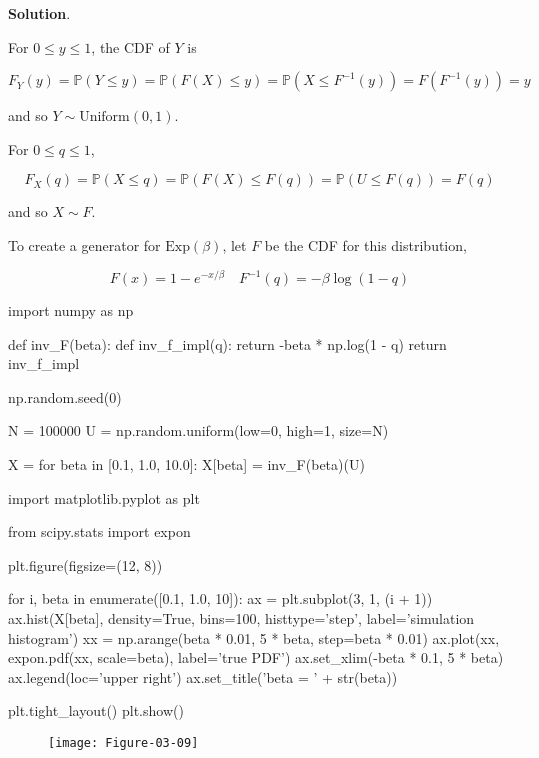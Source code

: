 \textbf{Solution}.

For \(0 \leq y \leq 1\), the CDF of \(Y\) is

\[ F_Y(y) = \mathbb{P}(Y \leq y) = \mathbb{P}(F(X) \leq y) = \mathbb{P}(X \leq F^{-1}(y)) = F(F^{-1}(y)) = y\]

and so \(Y \sim \text{Uniform}(0, 1)\).

For \(0 \leq q \leq 1\),

\[ F_X(q) = \mathbb{P}(X \leq q) = \mathbb{P}(F(X) \leq F(q)) = \mathbb{P}(U \leq F(q)) = F(q) \]

and so \(X \sim F\).

To create a generator for \(\text{Exp}(\beta)\), let \(F\) be the CDF
for this distribution,

\[ F(x) = 1 - e^{-x/\beta} \quad F^{-1}(q) = - \beta \log (1 - q) \]

\begin{python}
import numpy as np

def inv_F(beta):
    def inv_f_{i}mpl(q):
        return -beta * np.log(1 - q)
    return inv_f_{i}mpl
\end{python}

\begin{python}
np.random.seed(0)

N = 100000
U = np.random.uniform(low=0, high=1, size=N)

X = {}
for beta in [0.1, 1.0, 10.0]:
    X[beta] = inv_F(beta)(U)
\end{python}

\begin{python}
import matplotlib.pyplot as plt

from scipy.stats import expon

plt.figure(figsize=(12, 8))

for i, beta in enumerate([0.1, 1.0, 10]):
    ax = plt.subplot(3, 1, (i + 1))
    ax.hist(X[beta], density=True, bins=100, histtype='step', label='simulation histogram')
    xx = np.arange(beta * 0.01, 5 * beta, step=beta * 0.01)
    ax.plot(xx, expon.pdf(xx, scale=beta), label='true PDF')
    ax.set_xlim(-beta * 0.1, 5 * beta)
    ax.legend(loc='upper right')
    ax.set_title('beta = ' + str(beta))
    
plt.tight_layout()
plt.show()
\end{python}

\begin{figure}[H]
\centering
\texttt{[image: Figure-03-09]}
\end{figure}

